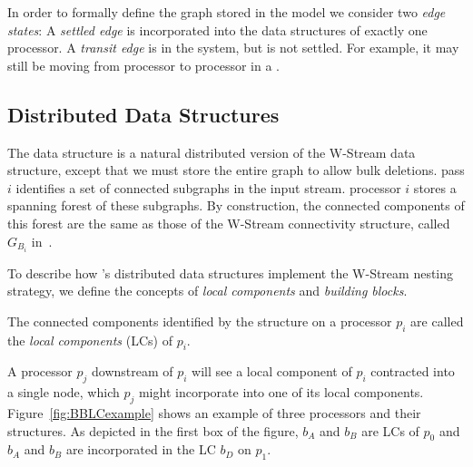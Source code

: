In order to formally define the graph stored in the \XStream model we consider
two \emph{edge states}:
A \emph{settled edge} is incorporated into the data structures of exactly one 
processor.
 A \emph{transit edge} is in the system, but is not settled. For example,
 it may still be moving from processor to processor in a \bundlens.



\subsection{Distributed Data Structures}
The \XStream data structure is a natural distributed version of the
W-Stream data structure, except that we must store the entire graph to allow
bulk deletions. \WStream pass $i$ identifies a set of connected subgraphs in
the input stream. \XStream processor $i$ stores a spanning forest of these
subgraphs.  By construction, the connected components of this forest are 
the same as those of the W-Stream connectivity structure, 
called $G_{B_i}$ in~\cite{AMP:demetrescu2009trading}.

\noindent
To describe how \XStreamns's distributed data structures implement the
W-Stream nesting strategy, we define the concepts of \emph{local
components} and \emph{building blocks}.
\begin{definition}
The connected components identified by the \uf structure on a processor $p_i$ are called the \emph{local components} (LCs) of $p_i$.
\end{definition}

A processor $p_j$ downstream of $p_i$ will see a local component of $p_i$ contracted into a single node, which $p_j$ might incorporate into one of its local components. Figure~\ref{fig:BBLCexample} shows an example of three processors and their \uf structures. As depicted in the first box of the figure, $b_A$ and $b_B$ are LCs of $p_0$ and $b_A$ and $b_B$ are incorporated in the LC $b_D$ on $p_1$.

